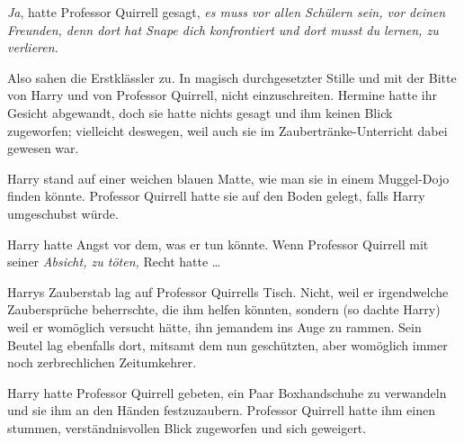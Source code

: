 \later

\emph{Ja}, hatte Professor Quirrell gesagt, \emph{es muss vor allen Schülern sein, vor deinen Freunden, denn dort hat Snape dich konfrontiert und dort musst du lernen, zu verlieren.}

Also sahen die Erstklässler zu. In magisch durchgesetzter Stille und mit der Bitte von Harry und von Professor Quirrell, nicht einzuschreiten. Hermine hatte ihr Gesicht abgewandt, doch sie hatte nichts gesagt und ihm keinen Blick zugeworfen; vielleicht deswegen, weil auch sie im Zaubertränke-Unterricht dabei gewesen war.

Harry stand auf einer weichen blauen Matte, wie man sie in einem Muggel-Dojo finden könnte. Professor Quirrell hatte sie auf den Boden gelegt, falls Harry umgeschubst würde.

Harry hatte Angst vor dem, was er tun könnte. Wenn Professor Quirrell mit seiner \emph{Absicht, zu töten,} Recht hatte …

Harrys Zauberstab lag auf Professor Quirrells Tisch. Nicht, weil er irgendwelche Zaubersprüche beherrschte, die ihm helfen könnten, sondern (so dachte Harry) weil er womöglich versucht hätte, ihn jemandem ins Auge zu rammen. Sein Beutel lag ebenfalls dort, mitsamt dem nun geschützten, aber womöglich immer noch zerbrechlichen Zeitumkehrer.

Harry hatte Professor Quirrell gebeten, ein Paar Boxhandschuhe zu verwandeln und sie ihm an den Händen festzuzaubern. Professor Quirrell hatte ihm einen stummen, verständnisvollen Blick zugeworfen und sich geweigert.

